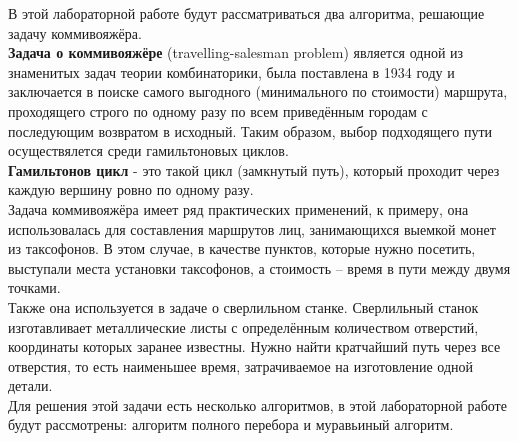 В этой лабораторной работе будут рассматриваться два алгоритма, решающие задачу коммивояжёра. \\

\textbf{Задача о коммивояжёре} (travelling-salesman problem) является одной из знаменитых задач теории комбинаторики, была поставлена в 1934 году и заключается в поиске самого выгодного (минимального по стоимости) маршрута, проходящего строго по одному разу по всем приведённым городам с последующим возвратом в исходный. Таким образом, выбор подходящего пути осуществялется среди гамильтоновых циклов.\\

\textbf{Гамильтонов цикл}  - это такой цикл (замкнутый путь), который проходит через каждую вершину ровно по одному разу.\\

Задача коммивояжёра имеет ряд практических применений, к примеру, она использовалась для составления маршрутов лиц, занимающихся выемкой монет из таксофонов. В этом случае, в качестве пунктов, которые нужно посетить, выступали места установки таксофонов, а стоимость -- время в пути между двумя точками. \\

Также она используется в задаче о сверлильном станке. Сверлильный станок изготавливает металлические листы с определённым количеством отверстий, координаты которых заранее известны. Нужно найти кратчайший путь через все отверстия, то есть наименьшее время, затрачиваемое на изготовление одной детали. \\

Для решения этой задачи есть несколько алгоритмов, в этой лабораторной работе будут рассмотрены: алгоритм полного перебора и муравьиный алгоритм.
